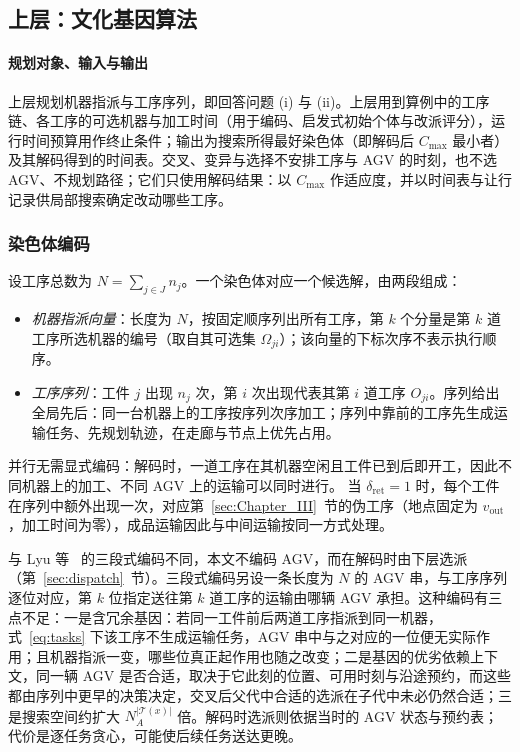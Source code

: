 \documentclass[manuscript,screen,review]{acmart}
\begin{document}
\subsection{上层：文化基因算法}
\label{sec:ga}

\paragraph{规划对象、输入与输出}
上层规划机器指派与工序序列，即回答问题 (i) 与 (ii)。上层用到算例中的工序链、各工序的可选机器与加工时间（用于编码、启发式初始个体与改派评分），运行时间预算用作终止条件；输出为搜索所得最好染色体（即解码后 $C_{\max}$ 最小者）及其解码得到的时间表。交叉、变异与选择不安排工序与 AGV 的时刻，也不选 AGV、不规划路径；它们只使用解码结果：以 $C_{\max}$ 作适应度，并以时间表与让行记录供局部搜索确定改动哪些工序。

\subsubsection{染色体编码}
\label{sec:encoding}

设工序总数为 $N=\sum_{j\in J}n_j$。一个染色体对应一个候选解，由两段组成：
\begin{itemize}[leftmargin=*,topsep=2pt,itemsep=1pt]
  \item \emph{机器指派向量}：长度为 $N$，按固定顺序列出所有工序，第 $k$ 个分量是第 $k$ 道工序所选机器的编号（取自其可选集 $\Omega_{ji}$）；该向量的下标次序不表示执行顺序。
  \item \emph{工序序列}：工件 $j$ 出现 $n_j$ 次，第 $i$ 次出现代表其第 $i$ 道工序 $O_{ji}$。序列给出全局先后：同一台机器上的工序按序列次序加工；序列中靠前的工序先生成运输任务、先规划轨迹，在走廊与节点上优先占用。
\end{itemize}
并行无需显式编码：解码时，一道工序在其机器空闲且工件已到后即开工，因此不同机器上的加工、不同 AGV 上的运输可以同时进行。
当 $\delta_{\mathrm{ret}}=1$ 时，每个工件在序列中额外出现一次，对应第~\ref{sec:Chapter_III}~节的伪工序（地点固定为 $v_{\mathrm{out}}$，加工时间为零），成品运输因此与中间运输按同一方式处理。

与 Lyu 等~\cite{lyu2019approach} 的三段式编码不同，本文不编码 AGV，而在解码时由下层选派（第~\ref{sec:dispatch}~节）。三段式编码另设一条长度为 $N$ 的 AGV 串，与工序序列逐位对应，第 $k$ 位指定送往第 $k$ 道工序的运输由哪辆 AGV 承担。这种编码有三点不足：一是含冗余基因：若同一工件前后两道工序指派到同一机器，式~\eqref{eq:tasks} 下该工序不生成运输任务，AGV 串中与之对应的一位便无实际作用；且机器指派一变，哪些位真正起作用也随之改变；二是基因的优劣依赖上下文，同一辆 AGV 是否合适，取决于它此刻的位置、可用时刻与沿途预约，而这些都由序列中更早的决策决定，交叉后父代中合适的选派在子代中未必仍然合适；三是搜索空间约扩大 $N_A^{|\mathcal{T}(x)|}$ 倍。解码时选派则依据当时的 AGV 状态与预约表；代价是逐任务贪心，可能使后续任务送达更晚。
\end{document}
